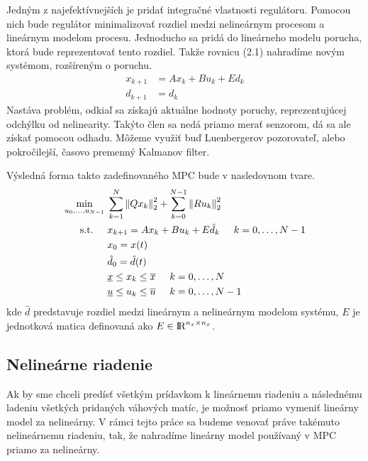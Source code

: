 Jedným z najefektívnejších je pridať integračné vlastnosti regulátoru. Pomocou nich bude regulátor minimalizovať rozdiel medzi nelineárnym procesom a lineárnym modelom procesu. Jednoducho sa pridá do lineárneho modelu porucha, ktorá bude reprezentovať tento rozdiel. Takže rovnicu (2.1) nahradíme novým systémom, rozšíreným o poruchu.
\begin{align}
	x_{k+1} &= Ax_{k} + Bu_{k} + Ed_{k}\\
	d_{k+1} &= d_{k}
\end{align}
Nastáva problém, odkiaľ sa získajú aktuálne hodnoty poruchy, reprezentujúcej odchýlku od nelinearity. Takýto člen sa nedá priamo merať senzorom, dá sa ale získať pomocou odhadu. Môžeme využiť buď Luenbergerov pozorovateľ, alebo pokročilejší, časovo premenný Kalmanov filter. 

Výsledná forma takto zadefinovaného MPC bude v nasledovnom tvare.
\begin{subequations}
	\begin{align}
	\displaystyle \min_{u_0,...,u_{N-1}} \hspace{0.1cm} & 
	\sum_{k=1}^{N}\left\lVert Qx_k\right\rVert^{2}_{2}+\sum_{k=0}^{N-1}\left\lVert Ru_k\right\rVert^{2}_{2}\\
	\textrm{s.t.} \hspace{0.5cm} & x_{k+1} = Ax_{k} + Bu_{k} + E\hat{d}_{k}\hspace{0.5cm} k=0,\dots,N-1\\
	& x_{0} = x(t)\\
	& \hat{d}_{0} = \hat{d}(t)\\
	& \underline{x} \leq x_{k} \leq \overline{x}\hspace{0.5cm} k=0,\dots,N\\
	& \underline{u} \leq u_{k} \leq \overline{u}\hspace{0.5cm} k=0,\dots,N-1
	\end{align}
\end{subequations}
kde $\hat{d}$ predstavuje rozdiel medzi lineárnym a nelineárnym modelom systému, $E$ je jednotková matica definovaná ako $E \in {\rm I\!R}^{n_{x}\times n_{x}}$.

\subsection{Nelineárne riadenie}
\label{subse:NelinearneMPC}
Ak by sme chceli predísť všetkým prídavkom k lineárnemu riadeniu a následnému ladeniu všetkých pridaných váhových matíc, je možnosť priamo vymeniť lineárny model za nelineárny. V rámci tejto práce sa budeme venovať práve takémuto nelineárnemu riadeniu, tak, že nahradíme lineárny model používaný v MPC priamo za nelineárny.

